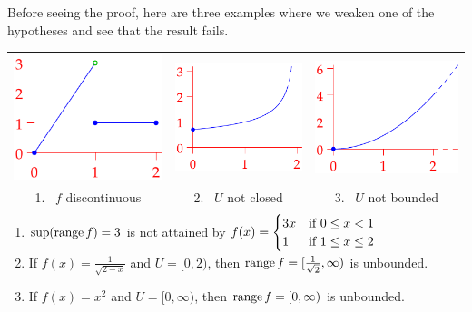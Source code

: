 \begin{examples}{}{}
	Before seeing the proof, here are three examples where we weaken one of the hypotheses and see that the result fails.
	\begin{center}
	\begin{tabular}{c@{\qquad}c@{\qquad}c}
		\includegraphics[scale=0.95]{extreme2}
		&
		\includegraphics[scale=0.95]{extreme3}
		&
		\includegraphics[scale=0.95]{extreme4}
		\\
		1. \ $f$ discontinuous
		&
		2. \ $U$ not closed
		&
		3. \ $U$ not bounded	
	\end{tabular}
	\end{center}
	\smallskip
	
	\begin{enumerate}
	  \item $\sup(\operatorname{range} f)=3$ is not attained by $f(x) =\smash{\begin{cases}
	  3x&\text{if }0\le x<1\\
	  1&\text{if }1\le x\le 2
	  \end{cases}}$\smallskip
	  \item If $f(x)=\frac 1{\sqrt{2-x}}$ and $U=[0,2)$, then $\operatorname{range} f=[\frac 1{\sqrt 2},\infty)$ is unbounded.
	  \item If $f(x)=x^2$ and $U=[0,\infty)$, then $\operatorname{range} f=[0,\infty)$ is unbounded.
	\end{enumerate}
\end{examples}

